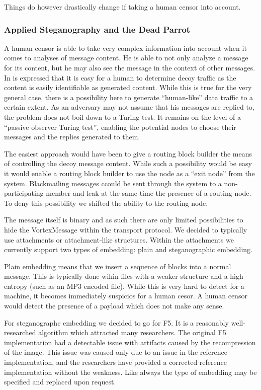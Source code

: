 \documentclass[10pt,journal,compsoc]{IEEEtran}
\begin{document}
Things do however drastically change if taking a human censor into account.

\subsubsection{Applied Steganography and the Dead Parrot}
A human censor is able to take very complex information into account when it comes to analyses of message content. He is able to not only analyze a message for its content, but he may also see the message in the context of other messages. In \cite{oakland2013-parrot} is expressed that it is easy for a human to determine decoy traffic as the content is easily identifiable as generated content. While this is true for the very general case, there is a possibility here to generate ``human-like'' data traffic to a certain extent. As an adversary may not assume that his messages are replied to, the problem does not boil down to a Turing test. It remains on the level of a ``passive observer Turing test'', enabling the potential nodes to choose their messages and the replies generated to them. 

The easiest approach would have been to give a routing block builder the means of controlling the decoy message content. While such a possibility would be easy it would enable a routing block builder to use the node as a ``exit node'' from the system. Blackmailing messages ccould be sent through the system to a non-participating member and leak at the same time the presence of a routing node. To deny this possibility we shifted the ability to the routing node.

The message itself is binary and as such there are only limited possibilities to hide the VortexMessage within the transport protocol. We decided to typically use attachments or attachment-like structures. Within the attachments we currently support two types of embedding: plain and steganographic embedding. 

Plain embedding means that we insert a sequence of blocks into a normal message. This is typically done wihin files with a weaker structure and a high entropy (such as an MP3 encoded file). While this is very hard to detect for a machine, it becomes immediately suspicios for a human cesor. A human censor would detect the presence of a payload which does not make any sense.

For steganographc embedding we decided to go for F5\cite{f5}. It is a reasonably well-researched algorithm which attracted many researchers. The original F5 implementation had a detectable issue with artifacts\cite{F5broken} caused by the recompression of the image. This issue was caused only due to an issue in the reference implementation, and the researchers have provided a corrected reference implementation without the weakness. Like always the type of embedding may be specified and replaced upon request. 
\end{document}
